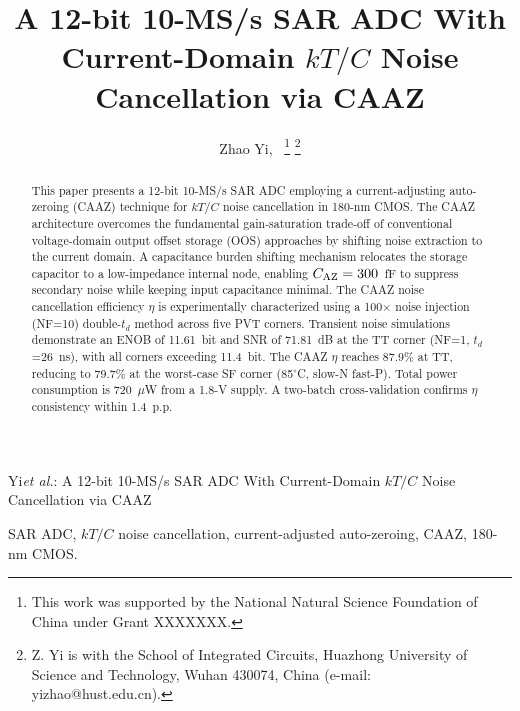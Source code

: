 \documentclass[journal]{IEEEtran}
\begin{document}
\title{A 12-bit 10-MS/s SAR ADC With Current-Domain $kT/C$ Noise Cancellation via CAAZ}

\author{Zhao Yi,~
\thanks{This work was supported by the National Natural Science Foundation of China under Grant XXXXXXX.}
\thanks{Z. Yi is with the School of Integrated Circuits, Huazhong University of Science and Technology, Wuhan 430074, China (e-mail: yizhao@hust.edu.cn).}}

%
{Yi\MakeLowercase{\textit{et al.}}: A 12-bit 10-MS/s SAR ADC With Current-Domain $kT/C$ Noise Cancellation via CAAZ}


\maketitle

\begin{abstract}
This paper presents a 12-bit 10-MS/s SAR ADC employing a current-adjusting auto-zeroing (CAAZ) technique for $kT/C$ noise cancellation in 180-nm CMOS. The CAAZ architecture overcomes the fundamental gain-saturation trade-off of conventional voltage-domain output offset storage (OOS) approaches by shifting noise extraction to the current domain. A capacitance burden shifting mechanism relocates the storage capacitor to a low-impedance internal node, enabling $C_{\rm AZ}=300$~fF to suppress secondary noise while keeping input capacitance minimal. The CAAZ noise cancellation efficiency $\eta$ is experimentally characterized using a 100$\times$ noise injection (NF=10) double-$t_d$ method across five PVT corners. Transient noise simulations demonstrate an ENOB of 11.61~bit and SNR of 71.81~dB at the TT corner (NF=1, $t_d$=26~ns), with all corners exceeding 11.4~bit. The CAAZ $\eta$ reaches 87.9\% at TT, reducing to 79.7\% at the worst-case SF corner (85$^\circ$C, slow-N fast-P). Total power consumption is 720~$\mu$W from a 1.8-V supply. A two-batch cross-validation confirms $\eta$ consistency within 1.4~p.p.
\end{abstract}

\begin{IEEEkeywords}
SAR ADC, $kT/C$ noise cancellation, current-adjusted auto-zeroing, CAAZ, 180-nm CMOS.
\end{IEEEkeywords}
\end{document}
